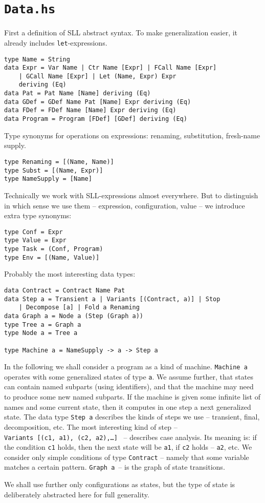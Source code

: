 \section{\texttt{Data.hs}}

First a definition of SLL abstract syntax. To make generalization easier, it
already includes \texttt{let}-expressions.
\begin{lstlisting}[name=data]
type Name = String
data Expr = Var Name | Ctr Name [Expr] | FCall Name [Expr] 
	| GCall Name [Expr] | Let (Name, Expr) Expr 
	deriving (Eq)
data Pat = Pat Name [Name] deriving (Eq)
data GDef = GDef Name Pat [Name] Expr deriving (Eq)
data FDef = FDef Name [Name] Expr deriving (Eq)
data Program = Program [FDef] [GDef] deriving (Eq)
\end{lstlisting}

Type synonyms for operations on expressions: renaming, substitution, fresh-name supply.
\begin{lstlisting}[name=data]
type Renaming = [(Name, Name)]
type Subst = [(Name, Expr)]
type NameSupply = [Name]
\end{lstlisting}

Technically we work with SLL-expressions almost everywhere. 
But to distinguish in which sense we use them --
expression, configuration, value --
we introduce extra type synonyms:
\begin{lstlisting}[name=data]
type Conf = Expr
type Value = Expr
type Task = (Conf, Program)
type Env = [(Name, Value)]
\end{lstlisting}

Probably the most interesting data types:
\begin{lstlisting}[name=data]
data Contract = Contract Name Pat
data Step a = Transient a | Variants [(Contract, a)] | Stop 
	| Decompose [a] | Fold a Renaming
data Graph a = Node a (Step (Graph a))
type Tree a = Graph a
type Node a = Tree a

type Machine a = NameSupply -> a -> Step a
\end{lstlisting}

In the following we shall consider a program as a kind of machine.
\texttt{Machine~a} operates with some generalized states of type \texttt{a}.
We assume further, that states can contain named subparts (using identifiers), and that
the machine may need to produce some new named subparts.
If the machine is given some infinite list of names and some current state,
then it computes in one step a next generalized state.
The data type \texttt{Step~a} describes the kinds of steps we use
-- transient, final, decomposition, etc. 
The most interesting kind of step -- \texttt{Variants~[(c1,~a1),~(c2,~a2),\ldots]}
~-- describes case analysis. 
Its meaning is: if the condition \texttt{c1} holds, then the next state will be \texttt{a1},
if \texttt{c2} holds -- \texttt{a2}, etc.
We consider only simple conditions of type \texttt{Contract} --
namely that some variable matches a certain pattern.
\texttt{Graph~a}~-- is the graph of state transitions.

We shall use further only configurations as states, but the type of state
is deliberately abstracted here for full generality.
